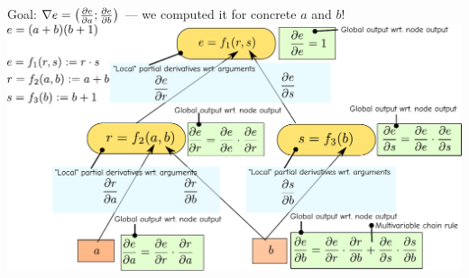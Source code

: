 \documentclass[12pt,aspectratio=169,handout]{beamer}
\begin{document}
\begin{frame}{Goal: $\nabla e = \left( \pdv{e}{a}; \pdv{e}{b} \right)$ --- we computed it for concrete $a$ and $b$!}
	\includegraphics[width=1.1\linewidth]{img/backprop10.pdf}
\end{frame}
\end{document}
